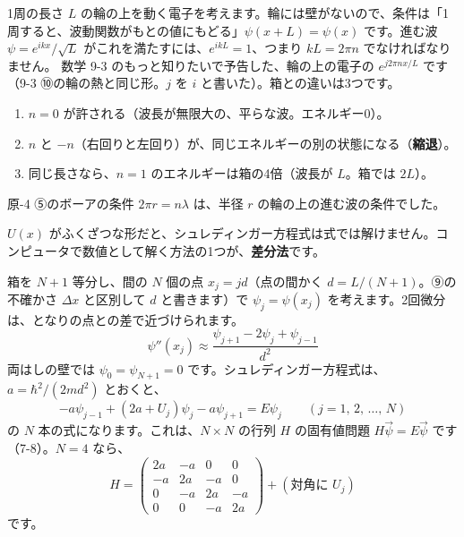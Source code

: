 \label{ph:原-5:sec11}
1周の長さ $L$ の輪の上を動く電子を考えます。輪には壁がないので、条件は「1周すると、波動関数がもとの値にもどる」$\psi(x+L)=\psi(x)$ です。進む波 $\psi=e^{ikx}/\sqrt L$ がこれを満たすには、$e^{ikL}=1$、つまり $kL=2\pi n$ でなければなりません。
数学 9-3 のもっと知りたいで予告した、輪の上の電子の $e^{j2\pi nx/L}$ です（9-3 ⑩の輪の熱と同じ形。$j$ を $i$ と書いた）。箱との違いは3つです。
\begin{enumerate}[label={\bkcircled{\arabic*}}, leftmargin=2.4\zw, itemsep=1pt, topsep=2pt]
\item $n=0$ が許される（波長が無限大の、平らな波。エネルギー0）。
\item $n$ と $-n$（右回りと左回り）が、同じエネルギーの別の状態になる（\textbf{縮退}）。
\item 同じ長さなら、$n=1$ のエネルギーは箱の4倍（波長が $L$。箱では $2L$）。
\end{enumerate}
原-4 ⑤のボーアの条件 $2\pi r=n\lambda$ は、半径 $r$ の輪の上の進む波の条件でした。

\label{ph:原-5:sec12}
$U(x)$ がふくざつな形だと、シュレディンガー方程式は式では解けません。コンピュータで数値として解く方法の1つが、\textbf{差分法}です。

箱を $N+1$ 等分し、間の $N$ 個の点 $x_j=jd$（点の間かく $d=L/(N+1)$。⑨の不確かさ $\Delta x$ と区別して $d$ と書きます）で $\psi_j=\psi(x_j)$ を考えます。2回微分は、となりの点との差で近づけられます。
\[\psi''(x_j)\approx\frac{\psi_{j+1}-2\psi_j+\psi_{j-1}}{d^2}\]
両はしの壁では $\psi_0=\psi_{N+1}=0$ です。シュレディンガー方程式は、$a=\hbar^2/(2md^2)$ とおくと、
\[-a\psi_{j-1}+(2a+U_j)\psi_j-a\psi_{j+1}=E\psi_j\qquad(j=1,\,2,\,\ldots,\,N)\]
の $N$ 本の式になります。これは、$N\times N$ の行列 $H$ の固有値問題 $H\vec\psi=E\vec\psi$ です（7-8）。$N=4$ なら、
\[H=\begin{pmatrix}2a&-a&0&0\\-a&2a&-a&0\\0&-a&2a&-a\\0&0&-a&2a\end{pmatrix}+(\text{対角に }U_j)\]
です。

